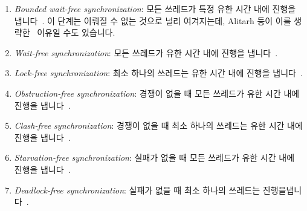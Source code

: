 \begin{enumerate}
\item	\emph{Bounded wait-free synchronization}: 모든 쓰레드가 특정 유한 시간
	내에 진행을 냅니다~\cite{Herlihy91}.
	이 단계는 이뤄질 수 없는 것으로 널리 여겨지는데, Alitarh 등이 이를
	생략한~\cite{DanAlitarh2013PracticalProgress} 이유일 수도 있습니다.
\item	\emph{Wait-free synchronization}: 모든 쓰레드가 유한 시간 내에 진행을
	냅니다~\cite{Herlihy93}.
\item	\emph{Lock-free synchronization}: 최소 하나의 쓰레드는 유한 시간 내에
	진행을 냅니다~\cite{Herlihy93}.
\item	\emph{Obstruction-free synchronization}: 경쟁이 없을 때 모든 쓰레드가
	유한 시간 내에 진행을 냅니다~\cite{HerlihyLM03}.
\item	\emph{Clash-free synchronization}: 경쟁이 없을 때 최소 하나의 쓰레드는 
	유한 시간 내에 진행을 냅니다~\cite{DanAlitarh2013PracticalProgress}.
\item	\emph{Starvation-free synchronization}: 실패가 없을 때 모든 쓰레드가
	유한 시간 내에 진행을 냅니다~\cite{DanAlitarh2013PracticalProgress}.
\item	\emph{Deadlock-free synchronization}: 실패가 없을 때 최소 하나의
	쓰레드는 진행을냅니다~\cite{DanAlitarh2013PracticalProgress}.

\iffalse

\item	\emph{Bounded wait-free synchronization}: Every thread
	will make progress within
	a specific finite period of time~\cite{Herlihy91}.
	This level is widely considered to be unachievable, which might be why
	Alitarh et al.\ omitted it~\cite{DanAlitarh2013PracticalProgress}.
\item	\emph{Wait-free synchronization}: Every thread will make progress
	in finite time~\cite{Herlihy93}.
\item	\emph{Lock-free synchronization}: At least one thread will
	make progress in finite time~\cite{Herlihy93}.
\item	\emph{Obstruction-free synchronization}: Every thread will
	make progress in finite time in the absence of
	contention~\cite{HerlihyLM03}.
\item	\emph{Clash-free synchronization}: At least one thread will
	make progress in finite time in the absence of
	contention~\cite{DanAlitarh2013PracticalProgress}.
\item	\emph{Starvation-free synchronization}: Every thread will
	make progress in finite time in the absence of
	failures~\cite{DanAlitarh2013PracticalProgress}.
\item	\emph{Deadlock-free synchronization}: At least one thread will
	make progress in finite time in the absence of
	failures~\cite{DanAlitarh2013PracticalProgress}.

\fi

\end{enumerate}

